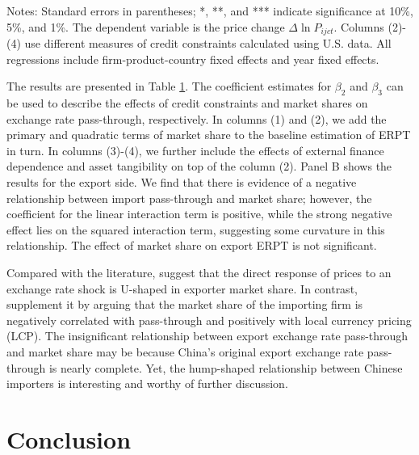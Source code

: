 \documentclass[12pt]{article}
\begin{document}
\begin{table}[htbp]
\begin{threeparttable}
\begin{tabular}{lcccc}
			\bottomrule
		\end{tabular}
		\begin{tablenotes}
			\footnotesize
			\item[Notes:] Standard errors in parentheses; *, **, and *** indicate significance at 10\%, 5\%, and 1\%. The dependent variable is the price change $\Delta \ln P_{ijct}$. Columns (2)-(4) use different measures of credit constraints calculated using U.S. data. All regressions include firm-product-country fixed effects and year fixed effects.
		\end{tablenotes}
	\end{threeparttable}
	\label{tab.share}
\end{table}

The results are presented in Table \ref{tab.share}. The coefficient estimates for $\beta_2$ and $\beta_3$ can be used to describe the effects of credit constraints and market shares on exchange rate pass-through, respectively. In columns (1) and (2), we add the primary and quadratic terms of market share to the baseline estimation of ERPT in turn. In columns (3)-(4), we further include the effects of external finance dependence and asset tangibility on top of the column (2). Panel B shows the results for the export side. We find that there is evidence of a negative relationship between import pass-through and market share; however, the coefficient for the linear interaction term is positive, while the strong negative effect lies on the squared interaction term, suggesting some curvature in this relationship. The effect of market share on export ERPT is not significant. 

Compared with the literature, \cite{auer2016} suggest that the direct response of prices to an exchange rate shock is U-shaped in exporter market share. In contrast, \cite{devereux2017} supplement it by arguing that the market share of the importing firm is negatively correlated with pass-through and positively with local currency pricing (LCP). The insignificant relationship between export exchange rate pass-through and market share may be because China's original export exchange rate pass-through is nearly complete. Yet, the hump-shaped relationship between Chinese importers is interesting and worthy of further discussion.

\section{Conclusion}\label{Conclusion}
\end{document}
